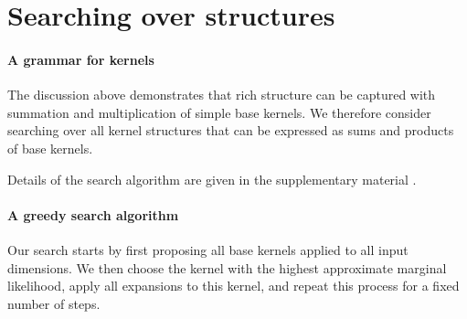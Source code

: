 \documentclass[twoside]{article}
\begin{document}
%

\section{Searching over structures}

\paragraph{A grammar for kernels}

The discussion above demonstrates that rich structure can be captured with summation and multiplication of simple base kernels.
We therefore consider searching over all kernel structures that can be expressed as sums and products of base kernels. 


Details of the search algorithm are given in the supplementary material .

\paragraph{A greedy search algorithm}
Our search starts by first proposing all base kernels applied to all input dimensions.  We then choose the kernel with the highest approximate marginal likelihood, apply all expansions to this kernel, and repeat this process for a fixed number of steps.
\end{document}
